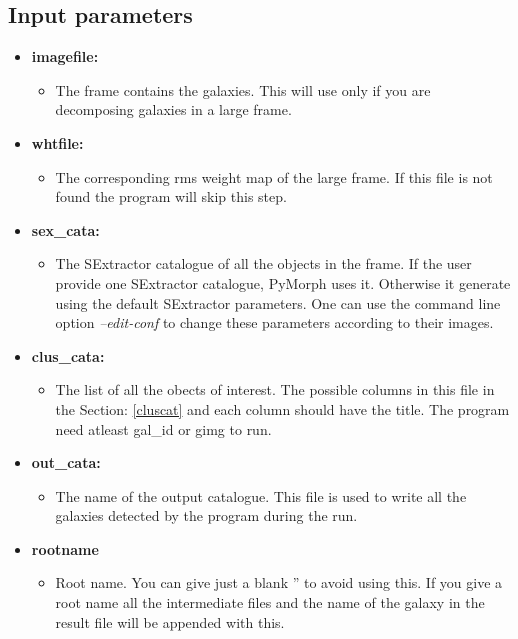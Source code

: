 \documentclass[a4paper,12pt]{article}
\begin{document}
\subsection{Input parameters}
\begin{itemize}
\item \textbf{imagefile:}
\begin{itemize}
\item[] The frame contains the galaxies. This will use only if you are decomposing galaxies in a large frame.
\end{itemize}

\item \textbf{whtfile:}
\begin{itemize}
\item[] The corresponding rms weight map of the large frame. If this file is not found the program will skip this step.
\end{itemize}

\item \textbf{sex\_cata:}
\begin{itemize}
\item[] The SExtractor catalogue of all the objects in the frame. If the user provide one SExtractor catalogue, PyMorph uses it. Otherwise it generate using the default SExtractor parameters. One can use the command line option \textit{--edit-conf} to change these parameters according to their images.
\end{itemize}

\item \textbf{clus\_cata:}
\begin{itemize}
\item[] The list of all the obects of interest. The possible columns in this file in the Section: \ref{cluscat} and each column should have the title. The program need atleast gal\_id or gimg to run.
\end{itemize}

\item \textbf{out\_cata:}
\begin{itemize}
\item[] The name of the output catalogue. This file is used to write all the galaxies detected by the program during the run.
\end{itemize}

\item \textbf{rootname}
\begin{itemize}
\item[] Root name. You can give just a blank '' to avoid using this. If you give a root name all the intermediate files and the name of the galaxy in the result file will be appended with this.
\end{itemize}


\end{itemize}
\end{document}
